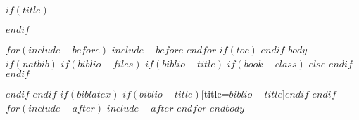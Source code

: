 \documentclass[$if(fontsize)$$fontsize$,$endif$$if(lang)$$lang$,$endif$]{$documentclass$}
\author{$for(author)$$author$$sep$ \and $endfor$}
\date{$date$}
\begin{document}
	$if(title)$
		\maketitle
	$endif$

	$for(include-before)$ $include-before$ $endfor$
	$if(toc)$
	{
		\hypersetup{linkcolor=black}
		\setcounter{tocdepth}{$toc-depth$}
		\tableofcontents
	}
	$endif$
	\newpage
	$body$
		$if(natbib)$
			$if(biblio-files)$
				$if(biblio-title)$
					$if(book-class)$
						\renewcommand\bibname{$biblio-title$}
					$else$
						\renewcommand\refname{$biblio-title$}
					$endif$
				$endif$
				
			$endif$
		$endif$
		$if(biblatex)$
			\printbibliography$if(biblio-title)$[title=$biblio-title$]$endif$
		$endif$
		$for(include-after)$
			$include-after$
		$endfor$
	$endbody$
\end{document}
